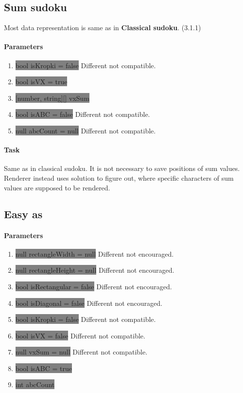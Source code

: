 \documentclass{report}
\begin{document}
\subsection{Sum sudoku}

Most data representation is same as in \textbf{Classical sudoku}. (3.1.1)

\paragraph{Parameters}
\begin{enumerate}
    \item[] \colorbox{gray}{bool isKropki = false} Different not compatible.
    \item[] \colorbox{gray}{bool isVX = true}
    \item[] \colorbox{gray}{[number, string][] vxSum}
    \item[] \colorbox{gray}{bool isABC = false} Different not compatible.
    \item[] \colorbox{gray}{null abcCount = null} Different not compatible.
\end{enumerate}

\paragraph{Task}
Same as in classical sudoku. It is not necessary to save positions of sum values. Renderer instead uses solution to figure out, where specific characters of sum values are supposed to be rendered.

\subsection{Easy as}

\paragraph{Parameters}
\begin{enumerate}
    \item[] \colorbox{gray}{null rectangleWidth = null} Different not encouraged.
    \item[] \colorbox{gray}{null rectangleHeight = null} Different not encouraged.
    \item[] \colorbox{gray}{bool isRectangular = false} Different not encouraged.
    \item[] \colorbox{gray}{bool isDiagonal = false} Different not encouraged.
    \item[] \colorbox{gray}{bool isKropki = false} Different not compatible.
    \item[] \colorbox{gray}{bool isVX = false} Different not compatible.
    \item[] \colorbox{gray}{null vxSum = null} Different not compatible.
    \item[] \colorbox{gray}{bool isABC = true}
    \item[] \colorbox{gray}{int abcCount}
\end{enumerate}
\end{document}
